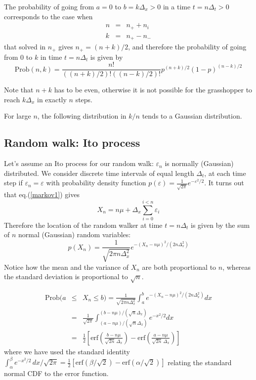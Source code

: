 \documentclass[justified, sixbynine]{tufte-book}
\theoremstyle{plain}%
\newtheorem * {corollary}{Corollary}
\theoremstyle{definition}
\theoremstyle{remark}
\newtheorem * {remark}{Remark}
\newtheorem * {note}{Note}
\begin{document}
\begin{fullwidth}
The probability of going from $a=0$ to $b=k\Delta _x>0$ in a time $t=n\Delta
_t>0$ corresponds to the case when
\begin{eqnarray}
n &=&n_{+}+n_i \\
k &=&n_{+}-n_{-}
\end{eqnarray}
that solved in $n_{+}$ gives $n_{+}=(n+k)/2$, and therefore the probability
of going from $0$ to $k$ in time $t=n\Delta _t$ is given by
\begin{equation}
\textrm{Prob}(n, k)=\frac{n!}{((n+k)/2)!((n-k)/2)!}p^{(n+k)/2}(1-p)^{(n-k)/2}
\end{equation}

Note that $n+k$ has to be even, otherwise it is not possible for the
grasshopper to reach $k\Delta _x$ in exactly $n$ steps.

For large $n$, the following distribution in $k/n$ tends to a Gaussian distribution.

\goodbreak\subsection{Random walk: Ito process}

Let's assume an Ito process for our random walk: $\varepsilon _n$ is normally
(Gaussian) distributed. We consider discrete time intervals of equal length $%
\Delta _t$, at each time step if $\varepsilon _n=\varepsilon $ with
probability density function $p(\varepsilon )=\frac{1}{\sqrt{2\pi}}e^{-\varepsilon ^2/2}$. It turns
out that eq.(\ref{markov1}) gives
\begin{equation}
X_n = n \mu + \Delta _x\sum_{i=0}^{i<n}\varepsilon _i
\end{equation}
Therefore the location of the random walker at time $t=n\Delta _t$ is given
by the sum of $n$ normal (Gaussian) random variables:
\begin{equation}
p(X_n)=\frac 1{\sqrt{2\pi n\Delta _x^2}}e^{-(X_n - n\mu)^2/(2n\Delta _x^2)}
\end{equation}
Notice how the mean and the variance of $X_n$ are both proportional
to $n$, whereas the standard deviation is proportional to $\sqrt{n}$.

\begin{eqnarray}
\textrm{Prob}(a &\leq &X_n\leq b)=\frac 1{\sqrt{2\pi n\Delta _x^2}}\int_a^be^{-(X_n - n\mu)^2/(2n%
\Delta _x^2)}dx \\
&=&\frac 1{\sqrt{2\pi }}\int_{(a-n\mu)/(\sqrt{n}\Delta _x)}^{(b-n\mu)/(\sqrt{n}\Delta
_x)}e^{-x^2/2}dx \\
&=&\frac{1}{2}\!\left[\textrm{erf}\!\left(\frac {b-n\mu}{\sqrt{2n}\,\Delta _x}\right)-\textrm{erf}\!\left(\frac {a-n\mu}{\sqrt{2n}\,\Delta
_x}\right)\right]
\end{eqnarray}
where we have used the standard identity $\int_\alpha^\beta e^{-x^2/2}\,dx/\sqrt{2\pi} = \tfrac{1}{2}[\textrm{erf}(\beta/\sqrt{2}) - \textrm{erf}(\alpha/\sqrt{2})]$ relating the standard normal CDF to the error function.


\end{fullwidth}
\end{document}
